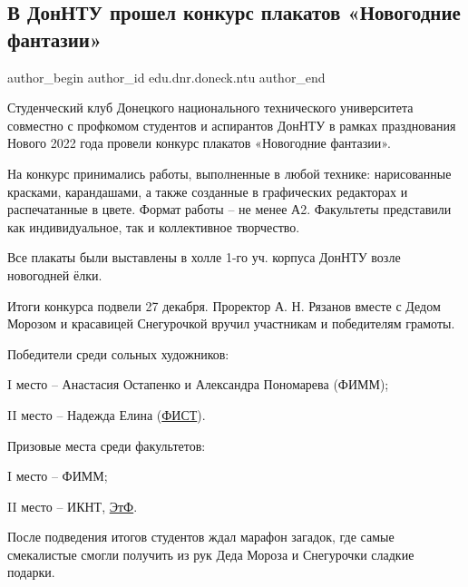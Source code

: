  
 
 
 
 

\subsection{В ДонНТУ прошел конкурс плакатов «Новогодние фантазии»}
\label{sec:28_12_2021.stz.edu.dnr.doneck.ntu.1.konkurs_plakatov_novogodnie_fantazii}

\ifcmt
 author_begin
   author_id edu.dnr.doneck.ntu
 author_end
\fi

Студенческий клуб Донецкого национального технического университета совместно с
профкомом студентов и аспирантов ДонНТУ в рамках празднования Нового 2022 года
провели конкурс плакатов «Новогодние фантазии».


На конкурс принимались работы, выполненные в любой технике: нарисованные
красками, карандашами, а также созданные в графических редакторах и
распечатанные в цвете. Формат работы – не менее А2. Факультеты представили как
индивидуальное, так и коллективное творчество.

Все плакаты были выставлены в холле 1-го уч. корпуса ДонНТУ возле новогодней
ёлки.

Итоги конкурса подвели 27 декабря. Проректор А. Н. Рязанов вместе с Дедом
Морозом и красавицей Снегурочкой вручил участникам и победителям грамоты.


Победители среди сольных художников:

I место – Анастасия Остапенко и Александра Пономарева (ФИММ);

II место – Надежда Елина (\href{http://donntu.org/fist}{ФИСТ}).

Призовые места среди факультетов:

I место – ФИММ;

II место – ИКНТ, \href{http://donntu.org/etf}{ЭтФ}.


После подведения итогов студентов ждал марафон загадок, где самые смекалистые
смогли получить из рук Деда Мороза и Снегурочки сладкие подарки.
